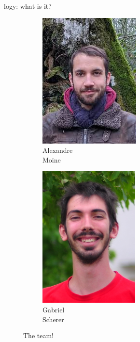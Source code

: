 \begin{frame}[fragile]{\Zoo[]logy: what is it?}
\begin{adjustwidth}{-1em}{-1em}
\begin{overbox}
\begin{figure}
\begin{subfigure}{0.24\textwidth}
        \end{subfigure}
        \begin{subfigure}{0.24\textwidth}
            \includegraphics[scale=0.3]{images/alexandre_moine.jpg}
            \caption*{\footnotesize Alexandre \\ Moine}
        \end{subfigure}
        \begin{subfigure}{0.24\textwidth}
            \includegraphics[scale=1.2]{images/gabriel_scherer.jpg}
            \caption*{\footnotesize Gabriel \\ Scherer}
        \end{subfigure}
        \caption*{The \Pstore team!}
    \end{figure}
\end{overbox}


\end{adjustwidth}
\end{frame}
